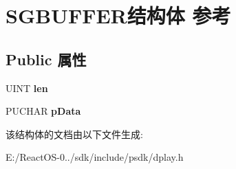 \hypertarget{struct_s_g_b_u_f_f_e_r}{}\section{S\+G\+B\+U\+F\+F\+E\+R结构体 参考}
\label{struct_s_g_b_u_f_f_e_r}
\subsection*{Public 属性}
\begin{DoxyCompactItemize}
\item 
\mbox{\label{struct_s_g_b_u_f_f_e_r_a44ac9a780178b6370f7ba6375b5fc638}} 
U\+I\+NT {\bfseries len}
\item 
\mbox{\label{struct_s_g_b_u_f_f_e_r_a53b4870d5c5bb79091b42b4661c0e943}} 
P\+U\+C\+H\+AR {\bfseries p\+Data}
\end{DoxyCompactItemize}


该结构体的文档由以下文件生成\+:\begin{DoxyCompactItemize}
\item 
E\+:/\+React\+O\+S-\/0../sdk/include/psdk/dplay.\+h\end{DoxyCompactItemize}
